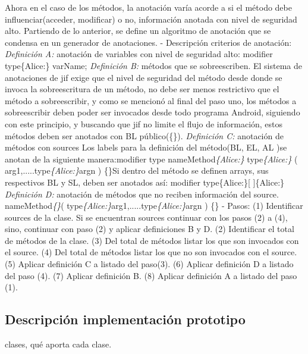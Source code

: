 Ahora en el caso de los métodos, la anotación varía acorde a si el método debe
influenciar(acceder, modificar) o no, información anotada con nivel de seguridad
alto.
Partiendo de lo anterior, se define un algoritmo de anotación que se condensa en
un generador de anotaciones.\newline 
- Descripción criterios de anotación:\newline
\textit{Definición A:} anotación de variables con nivel de seguridad alto:
\newline 
modifier type\{Alice:\} varName;\newline 
\textit{Definición B:} métodos que se sobreescriben. El sistema de anotaciones
de jif exige que el nivel de seguridad del método desde donde se invoca la
sobreescritura de un método, no debe ser menos restrictivo que el método a
sobreescribir, y como se mencionó al final del paso uno, los métodos a
sobreescribir deben poder ser invocados desde todo programa Android, siguiendo
con este principio, y buscando que jif no limite el flujo de información, estos
métodos deben ser anotados con BL público(\{\}).\newline 
\textit{Definición C:} anotación de métodos con sources\newline
Los labels para la definición del método(BL, EL, AL )se anotan de la
siguiente manera:\newline modifier type
nameMethod\textit{\{Alice:\}} type\textit{\{Alice:\}}
( arg1,.....type\textit{\{Alice:\}}argn ) \{\}\newline Si dentro del método se
definen arrays, sus respectivos BL y SL, deben ser anotados así: modifier type\{Alice:\}[ ]\{Alice:\}\newline
\textit{Definición D:} anotación de métodos que no reciben información del
source. 
nameMethod\textit{\{\}}(
type\textit{\{Alice:\}}arg1,.....type\textit{\{Alice:\}}argn ) \{\}\newline
- Pasos:\newline
(1) Identificar sources de la clase. Si se encuentran sources continuar con
los pasos (2) a (4), sino, continuar con paso (2) y aplicar definiciones B y
D.\newline
(2) Identificar el total de métodos de la clase.\newline
(3) Del total de métodos listar los que son invocados con el source.\newline
(4) Del total de métodos listar los que no son invocados con el source.\newline
(5) Aplicar definición C a listado del paso(3).\newline
(6) Aplicar definición D a listado del paso (4).\newline
(7) Aplicar definición B. \newline
(8) Aplicar definición A a listado del paso (1).

\subsection{Descripción implementación prototipo}
clases, qué aporta cada clase.

